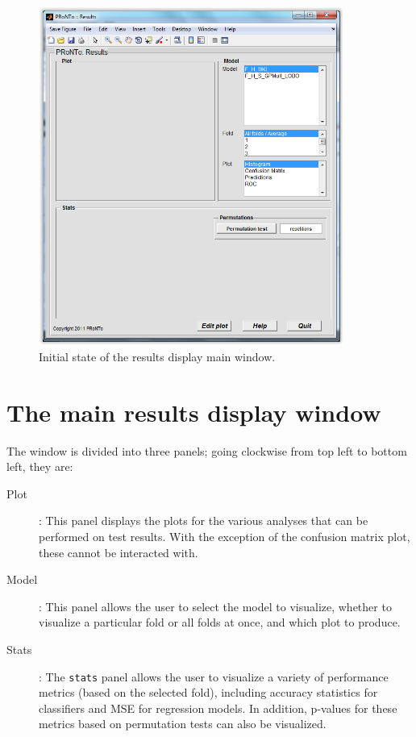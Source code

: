 \begin{figure}[h!]
\begin{center}
\includegraphics[width=10cm]{images/prt_ui_results_emptyWin.png}
\caption{Initial state of the results display main window.}
\label{fig_prt_ui_results_emptyWin} 
\end{center}
\end{figure}

\section{The main results display window}

The window is divided into three panels; going clockwise from top left to bottom left, they
are:
\begin{description}
\item[Plot]: This panel displays the plots for the various analyses that can be performed on
test results. With the exception of the confusion matrix plot, these cannot be interacted with.
\item[Model]: This panel allows the user to select the model to visualize, whether to visualize a
particular fold or all folds at once, and which plot to produce.
\item[Stats]: The {\tt stats} panel allows the user to visualize a variety of performance metrics (based on the selected fold), including accuracy statistics for classifiers and MSE for regression models. In addition, p-values for these metrics based on permutation tests can also be visualized.
\end{description}

